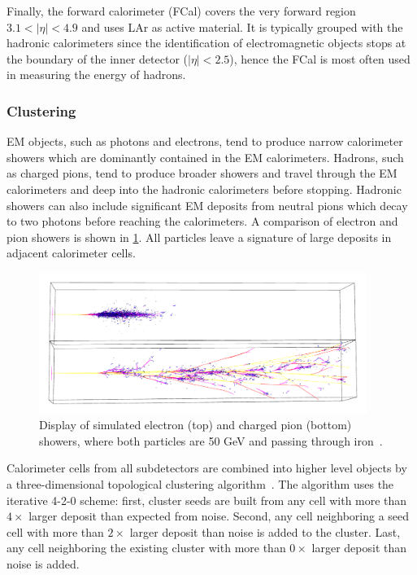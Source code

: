 Finally, the forward calorimeter (FCal) covers the very forward region $3.1 < |\eta| < 4.9$ and uses LAr as active material. It is typically grouped with the hadronic calorimeters since the identification of electromagnetic objects stops at the boundary of the inner detector ($|\eta| < 2.5$), hence the FCal is most often used in measuring the energy of hadrons.

\subsubsection{Clustering}

EM objects, such as photons and electrons, tend to produce narrow calorimeter showers which are dominantly contained in the EM calorimeters. Hadrons, such as charged pions, tend to produce broader showers and travel through the EM calorimeters and deep into the hadronic calorimeters before stopping. Hadronic showers can also include significant EM deposits from neutral pions which decay to two photons before reaching the calorimeters. A comparison of electron and pion showers is shown in \cref{fig:atlas-detector-showers}. All particles leave a signature of large deposits in adjacent calorimeter cells.

\begin{figure}[tp]
  \centering
  \includegraphics[width=0.95\textwidth]{figures/lhc-atlas/svenmenke_showers}
  \caption{Display of simulated electron (top) and charged pion (bottom) showers, where both particles are 50 GeV and passing through iron~\cite{svenmenke-showers}.}
  \label{fig:atlas-detector-showers}
\end{figure}

Calorimeter cells from all subdetectors are combined into higher level objects by a three-dimensional topological clustering algorithm~\cite{ATL-LARG-PUB-2008-002}. The algorithm uses the iterative \textsc{4-2-0} scheme: first, cluster seeds are built from any cell with more than $4\times$ larger deposit than expected from noise. Second, any cell neighboring a seed cell with more than $2\times$ larger deposit than noise is added to the cluster. Last, any cell neighboring the existing cluster with more than $0\times$ larger deposit than noise is added.

